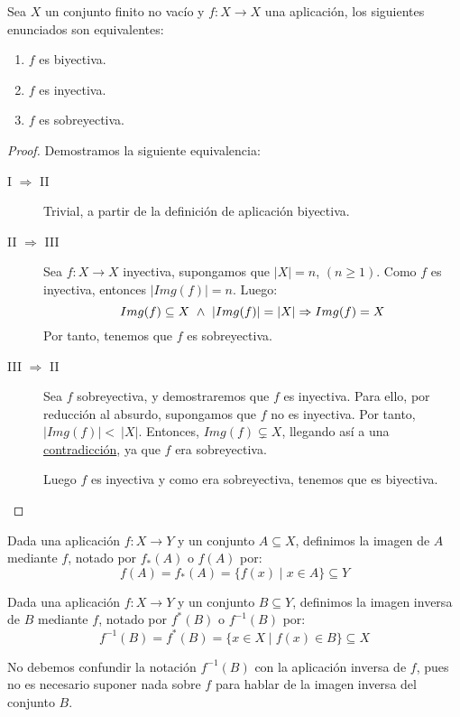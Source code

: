 \begin{prop}\label{prop:ConjFinito_Equivalencias}
    Sea $X$ un conjunto finito no vacío y $f:X \rightarrow X$ una aplicación, los siguientes enunciados
    son equivalentes:
    \begin{enumerate}[label=\roman*.]
        \item $f$ es biyectiva.
        \item $f$ es inyectiva.
        \item $f$ es sobreyectiva.
    \end{enumerate}
\end{prop}
\begin{proof} Demostramos la siguiente equivalencia:
\begin{description} 
    \item[I $\Longrightarrow$ II] Trivial, a partir de la definición de aplicación biyectiva.
    
    \item[II $\Longrightarrow$ III] Sea $f:X \rightarrow X$ inyectiva, supongamos que $|X| = n$, $(n \geq 1)$. Como $f$ es inyectiva, entonces $|Img(f)| = n$. Luego:
    $$Img(f) \subseteq X \ \land \  |Img(f)| = |X| \Rightarrow Img(f) = X$$
    Por tanto, tenemos que $f$ es sobreyectiva.

    \item[III $\Longrightarrow$ II] Sea $f$ sobreyectiva, y demostraremos que $f$ es inyectiva. Para ello, por reducción al absurdo, supongamos que $f$ no es inyectiva. Por tanto, $|Img(f)|<~|X|$. Entonces, $Img(f) \subsetneq X$, llegando así a una \underline{contradicción}, ya que $f$ era sobreyectiva.
    
    Luego $f$ es inyectiva y como era sobreyectiva, tenemos que es biyectiva.
\end{description}
\end{proof}

\begin{definicion}
    Dada una aplicación ${f:X\rightarrow Y}$ y un conjunto $A\subseteq X$, definimos la imagen de $A$ mediante $f$, notado por $f_*(A)$ o $f(A)$ por:
    \begin{equation*}
        f(A) = f_*(A) = \{f(x) \mid x \in A\} \subseteq Y
    \end{equation*}
\end{definicion}

\begin{definicion}
    Dada una aplicación $f:X\rightarrow Y$ y un conjunto $B\subseteq Y$, definimos la imagen inversa de $B$ mediante $f$, notado por $f^*(B)$ o $f^{-1}(B)$ por:
    \begin{equation*}
        f^{-1}(B) = f^*(B) = \{x \in X \mid f(x) \in B\} \subseteq X
    \end{equation*}
\end{definicion}
No debemos confundir la notación $f^{-1}(B)$ con la aplicación inversa de $f$, pues no es necesario suponer nada sobre $f$ para hablar de la imagen inversa del conjunto $B$.

